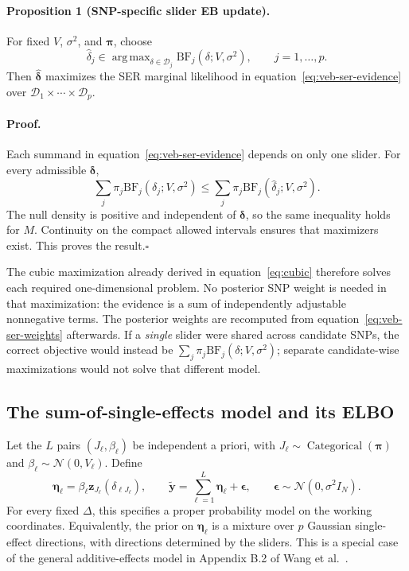 \documentclass[11pt]{article}
\newcommand{\Normal}{\mathcal{N}}
\newcommand{\BF}{\mathrm{BF}}
\DeclareMathOperator*{\argmax}{arg\,max}
\begin{document}
\paragraph{Proposition 1 (SNP-specific slider EB update).}
For fixed $V$, $\sigma^2$, and $\boldsymbol\pi$, choose
\begin{equation}
\widehat\delta_j\in\argmax_{\delta\in\mathcal D_j}
       \BF_j(\delta;V,\sigma^2),\qquad j=1,\ldots,p.
\label{eq:veb-separate-maxima}
\end{equation}
Then $\widehat{\boldsymbol\delta}$ maximizes the SER marginal
likelihood in equation~\eqref{eq:veb-ser-evidence} over
$\mathcal D_1\times\cdots\times\mathcal D_p$.

\paragraph{Proof.}
Each summand in equation~\eqref{eq:veb-ser-evidence} depends on only
one slider. For every admissible $\boldsymbol\delta$,
\begin{equation}
\sum_j\pi_j\BF_j(\delta_j;V,\sigma^2)
 \leq\sum_j\pi_j\BF_j(\widehat\delta_j;V,\sigma^2).
\label{eq:veb-separability-proof}
\end{equation}
The null density is positive and independent of
$\boldsymbol\delta$, so the same inequality holds for $M$.
Continuity on the compact allowed intervals ensures that maximizers
exist. This proves the result.\hfill$\square$

The cubic maximization already derived in equation~\eqref{eq:cubic}
therefore solves each required one-dimensional problem. No posterior
SNP weight is needed in that maximization: the evidence is a sum of
independently adjustable nonnegative terms. The posterior weights
are recomputed from equation~\eqref{eq:veb-ser-weights} afterwards.
If a \emph{single} slider were shared across candidate SNPs, the
correct objective would instead be
$\sum_j\pi_j\BF_j(\delta;V,\sigma^2)$; separate candidate-wise
maximizations would not solve that different model.

\subsection{The sum-of-single-effects model and its ELBO}

Let the $L$ pairs $(J_\ell,\beta_\ell)$ be independent a priori,
with $J_\ell\sim\operatorname{Categorical}(\boldsymbol\pi)$ and
$\beta_\ell\sim\Normal(0,V_\ell)$. Define
\begin{equation}
\boldsymbol\eta_\ell
 =\beta_\ell\mathbf z_{J_\ell}(\delta_{\ell J_\ell}),\qquad
\widetilde{\mathbf y}=\sum_{\ell=1}^L\boldsymbol\eta_\ell
      +\boldsymbol\epsilon,\qquad
\boldsymbol\epsilon\sim\Normal(0,\sigma^2 I_N).
\label{eq:veb-sum-model}
\end{equation}
For every fixed $\Delta$, this specifies a proper probability model
on the working coordinates. Equivalently, the prior on
$\boldsymbol\eta_\ell$ is a mixture over $p$ Gaussian single-effect
directions, with directions determined by the sliders. This is a
special case of the general additive-effects model in Appendix B.2
of Wang et al.~\cite{wang2018susie}.
\end{document}
